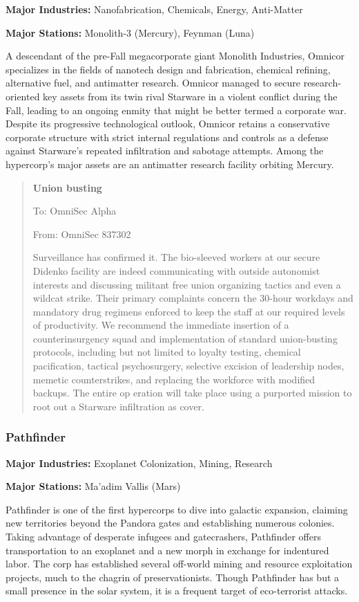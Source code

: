\textbf{Major Industries:} Nanofabrication, Chemicals, Energy, Anti-Matter 

\textbf{Major Stations:} Monolith-3 (Mercury), Feynman (Luna) 

A descendant of the pre-Fall megacorporate giant Monolith Industries, Omnicor specializes in the fields of nanotech design and fabrication, chemical refining, alternative fuel, and antimatter research. Omnicor managed to secure research-oriented key assets from its twin rival Starware in a violent conflict during the Fall, leading to an ongoing enmity that might be better termed a corporate war. Despite its progressive technological outlook, Omnicor retains a conservative corporate structure with strict internal regulations and controls as a defense against Starware's repeated infiltration and sabotage attempts. Among the hypercorp's major assets are an antimatter research facility orbiting Mercury. 

\begin{quotation} \textbf{Union busting} 

To: OmniSec Alpha 

From: OmniSec 837302 

Surveillance has confirmed it. The bio-sleeved workers at our secure Didenko facility are indeed communicating with outside autonomist interests and discussing militant free union organizing tactics and even a wildcat strike. Their primary complaints concern the 30-hour workdays and mandatory drug regimens enforced to keep the staff at our required levels of productivity. We recommend the immediate insertion of a counterinsurgency squad and implementation of standard union-busting protocols, including but not limited to loyalty testing, chemical pacification, tactical psychosurgery, selective excision of leadership nodes, memetic counterstrikes, and replacing the workforce with modified backups. The entire op eration will take place using a purported mission to root out a Starware infiltration as cover. \end{quotation} 

\subsubsection{Pathfinder} \label{sec:pathfinder} 

\textbf{Major Industries:} Exoplanet Colonization, Mining, Research 

\textbf{Major Stations:} Ma'adim Vallis (Mars) 

Pathfinder is one of the first hypercorps to dive into galactic expansion, claiming new territories beyond the Pandora gates and establishing numerous colonies. Taking advantage of desperate infugees and gatecrashers, Pathfinder offers transportation to an exoplanet and a new morph in exchange for indentured labor. The corp has established several off-world mining and resource exploitation projects, much to the chagrin of preservationists. Though Pathfinder has but a small presence in the solar system, it is a frequent target of eco-terrorist attacks. 

